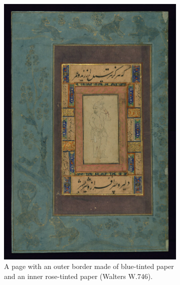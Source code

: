 \begin{figure}[h!tp]
\begin{subfigure}[t]{.33\textwidth}
                \includegraphics[height=0.3\textheight]{images/W746_000001_sap.jpg}
		\caption{A page with an outer border made of blue-tinted paper and an inner rose-tinted paper (Walters W.746).}
                \label{fig:ara_blue}
        \end{subfigure}
	\hfill
	\begin{subfigure}[t]{.3\columnwidth}
		\centering

\end{subfigure}
\end{figure}
